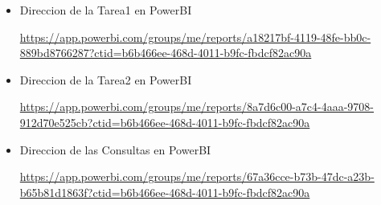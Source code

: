 \begin{itemize}
\item Direccion de la Tarea1 en PowerBI

\begin{center}
\href{https://app.powerbi.com/groups/me/reports/a18217bf-4119-48fe-bb0c-889bd8766287?ctid=b6b466ee-468d-4011-b9fc-fbdcf82ac90a}{https://app.powerbi.com/groups/me/reports/a18217bf-4119-48fe-bb0c-889bd8766287?ctid=b6b466ee-468d-4011-b9fc-fbdcf82ac90a}
\end{center}


\item Direccion de la Tarea2 en PowerBI

\begin{center}
\href{https://app.powerbi.com/groups/me/reports/8a7d6c00-a7c4-4aaa-9708-912d70e525cb?ctid=b6b466ee-468d-4011-b9fc-fbdcf82ac90a}{https://app.powerbi.com/groups/me/reports/8a7d6c00-a7c4-4aaa-9708-912d70e525cb?ctid=b6b466ee-468d-4011-b9fc-fbdcf82ac90a}
\end{center}


\item Direccion de las Consultas en PowerBI

\begin{center}
\href{https://app.powerbi.com/groups/me/reports/67a36cce-b73b-47dc-a23b-b65b81d1863f?ctid=b6b466ee-468d-4011-b9fc-fbdcf82ac90a}{https://app.powerbi.com/groups/me/reports/67a36cce-b73b-47dc-a23b-b65b81d1863f?ctid=b6b466ee-468d-4011-b9fc-fbdcf82ac90a}
\end{center}




\end{itemize}








